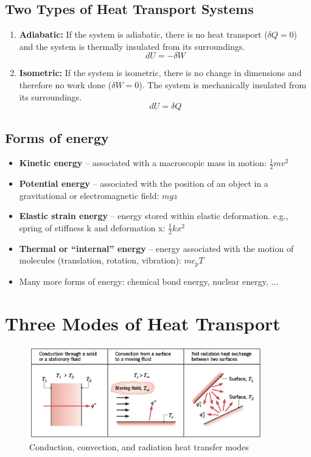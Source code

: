 \documentclass[12pt, a4paper]{article}
\begin{document}
\subsection{Two Types of Heat Transport Systems}
\begin{enumerate}
    \item \textbf{Adiabatic:} If the system is adiabatic, there is no heat transport ($\delta Q = 0$) and the system is thermally insulated from its surroundings.
    \[ dU = -\delta W \]
    \item \textbf{Isometric:} If the system is isometric, there is no change in dimensions and therefore no work done ($\delta W = 0$). The system is mechanically insulated from its surroundings. 
    \[ dU = \delta Q \]
\end{enumerate}

\subsection{Forms of energy}
\begin{itemize}
    \item \textbf{Kinetic energy} – associated with a macroscopic mass in motion: $\frac{1}{2} mv^{2}$
    \item \textbf{Potential energy} – associated with the position of an object in a gravitational or electromagnetic field: $mgz$
    \item \textbf{Elastic strain energy} – energy stored within elastic deformation. e.g., spring of stiffness k and deformation x: $\frac{1}{2} k x^{2}$
    \item \textbf{Thermal or “internal” energy} – energy associated with the motion of molecules (translation, rotation, vibration): $mc_{p}T$
    \item Many more forms of energy: chemical bond energy, nuclear energy, ...
\end{itemize}

\section{Three Modes of Heat Transport}
\begin{figure}[H]
    \centering
    \includegraphics[width = 0.9\textwidth]{img/modes_of_heat_transport.eps}
    \caption{Conduction, convection, and radiation heat transfer modes}
\end{figure}
\end{document}
